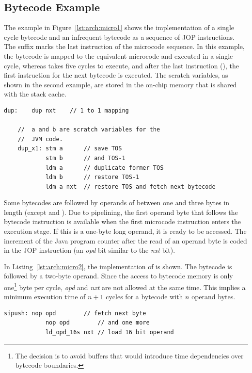 \subsection{Bytecode Example}

The example in Figure~\ref{lst:arch:micro1} shows the implementation
of a single cycle bytecode and an infrequent bytecode as a sequence
of JOP instructions. The suffix  marks the last
instruction of the microcode sequence. In this example, the
 bytecode is mapped to the equivalent  microcode
and executed in a single cycle, whereas  takes five
cycles to execute, and after the last instruction (), the first instruction for the next bytecode is executed. The
scratch variables, as shown in the second example, are stored in the
on-chip memory that is shared with the stack cache.

\begin{lstlisting}[caption={Implementation of \code{dup} and \code{dup\_x1}},
label=lst:arch:micro1]
    dup:    dup nxt    // 1 to 1 mapping

    //  a and b are scratch variables for the
    //  JVM code.
    dup_x1: stm a      // save TOS
            stm b      // and TOS-1
            ldm a      // duplicate former TOS
            ldm b      // restore TOS-1
            ldm a nxt  // restore TOS and fetch next bytecode
\end{lstlisting}

Some bytecodes are followed by operands of between one and three
bytes in length (except  and ).
Due to pipelining, the first operand byte that follows the bytecode
instruction is available when the first microcode instruction enters
the execution stage. If this is a one-byte long operand, it is ready
to be accessed. The increment of the Java program counter after the
read of an operand byte is coded in the JOP instruction (an
\emph{opd} bit similar to the \emph{nxt} bit).

In Listing~\ref{lst:arch:micro2}, the implementation of
 is shown. The bytecode is followed by a two-byte
operand. Since the access to bytecode memory is only
one\footnote{The decision is to avoid buffers that would introduce
time dependencies over bytecode boundaries.} byte per cycle,
\emph{opd} and \emph{nxt} are not allowed at the same time. This
implies a minimum execution time of $n+1$ cycles for a bytecode with
$n$ operand bytes.

\begin{lstlisting}[caption={Bytecode operand load},
label=lst:arch:micro2]
    sipush: nop opd        // fetch next byte
            nop opd        // and one more
            ld_opd_16s nxt // load 16 bit operand
\end{lstlisting}


